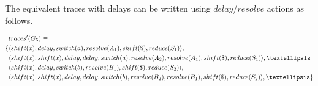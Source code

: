 \documentclass[envcountsame,runningheads]{llncs}
\begin{document}
The equivalent traces with delays can be written using $delay$/$resolve$ actions as follows.

{\small\parbox{.3\textwidth}{\begin{align*}
&traces^{\prime}(G_5) \equiv \\
\{ & \langle shift(x), delay, switch(a), resolve(A_1), shift(\$), reduce(S_1) \rangle,\\
   & \langle shift(x), shift(x), delay, delay, switch(a), resolve(A_2), resolve(A_1), shift(\$), reduce(S_1) \rangle, \textellipsis \\
   & \langle shift(x), delay, switch(b), resolve(B_1), shift(\$), reduce(S_2) \rangle,\\
   & \langle shift(x), shift(x), delay, delay, switch(b), resolve(B_2), resolve(B_1), shift(\$), reduce(S_2) \rangle, \textellipsis \}
\end{align*}}}
\end{document}
